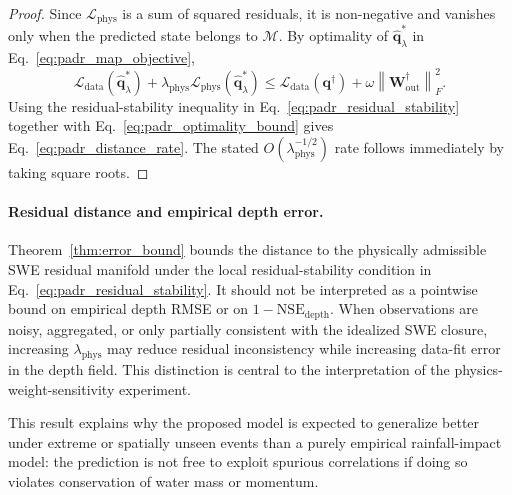 \documentclass[pdflatex,sn-mathphys-ay]{sn-jnl}
\theoremstyle{thmstyleone}
\begin{document}
\begin{proof}
Since $\mathcal{L}_{\mathrm{phys}}$ is a sum of squared residuals, it
is non-negative and vanishes only when the predicted state belongs to
$\mathcal{M}$.  By optimality of
$\hat{\mathbf{q}}^{*}_{\lambda}$ in Eq.~\eqref{eq:padr_map_objective},
\begin{equation}
  \mathcal{L}_{\mathrm{data}}
  \left(
    \hat{\mathbf{q}}^{*}_{\lambda}
  \right)
  +
  \lambda_{\mathrm{phys}}
  \mathcal{L}_{\mathrm{phys}}
  \left(
    \hat{\mathbf{q}}^{*}_{\lambda}
  \right)
  \leq
  \mathcal{L}_{\mathrm{data}}
  \left(
    \mathbf{q}^{\dagger}
  \right)
  +
  \omega
  \left\|
    \mathbf{W}^{\dagger}_{\mathrm{out}}
  \right\|_{F}^{2}.
  \label{eq:padr_optimality_bound}
\end{equation}
Using the residual-stability inequality in
Eq.~\eqref{eq:padr_residual_stability} together with
Eq.~\eqref{eq:padr_optimality_bound} gives
Eq.~\eqref{eq:padr_distance_rate}.  The stated
$O(\lambda_{\mathrm{phys}}^{-1/2})$ rate follows immediately by taking
square roots.
\end{proof}

\paragraph{Residual distance and empirical depth error.}
Theorem~\ref{thm:error_bound} bounds the distance to the physically
admissible SWE residual manifold under the local residual-stability condition in
Eq.~\eqref{eq:padr_residual_stability}.  It should not be
interpreted as a pointwise bound on empirical depth RMSE or on
$1-\mathrm{NSE}_{\mathrm{depth}}$.  When observations are noisy,
aggregated, or only partially consistent with the idealized SWE
closure, increasing $\lambda_{\mathrm{phys}}$ may reduce residual
inconsistency while increasing data-fit error in the depth field.  This
distinction is central to the interpretation of the
physics-weight-sensitivity experiment.

This result explains why the proposed model is expected to generalize
better under extreme or spatially unseen events than a purely empirical
rainfall-impact model: the prediction is not free to exploit spurious
correlations if doing so violates conservation of water mass or
momentum.
\end{document}
